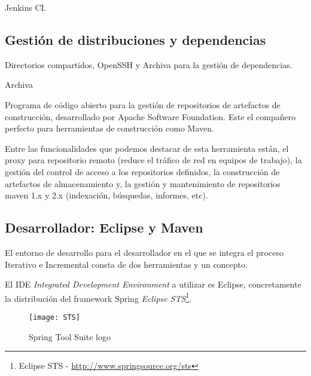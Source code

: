 \par Jenkins CI.


\subsection{Gestión de distribuciones y dependencias}
\label{sub:distribuciones-dependencias}

\par Directorios compartidos, OpenSSH y Archiva para la gestión de dependencias.

Archiva

Programa de código abierto para la gestión de repositorios de artefactos de construcción, desarrollado por Apache Software Foundation. Este el compañero perfecto para herramientas de construcción como Maven.

Entre las funcionalidades que podemos destacar de esta herramienta están, el proxy para repositorio remoto (reduce el tráfico de red en equipos de trabajo), la gestión del control de acceso a los repositorios definidos, la construcción de artefactos de almacenamiento y, la gestión y mantenimiento de repositorios maven 1.x y 2.x (indexación, búsquedas, informes, etc).




\subsection{Desarrollador: Eclipse y Maven}
\label{sub:eclipse-mvn-tdd}

\par El entorno de desarrollo para el desarrollador en el que se integra el proceso Iterativo e Incremental consta de dos herramientas y un concepto.

\par El IDE \emph{Integrated Development Environment} a utilizar es Eclipse, concretamente la distribución del framework Spring \emph{Eclipse STS}\footnote{Eclipse STS - \url{http://www.springsource.org/sts}}. 

\begin{figure}[H]
    \centering
    \texttt{[image: STS]}
    \caption{Spring Tool Suite logo}
    \label{fig:sts}
\end{figure}

